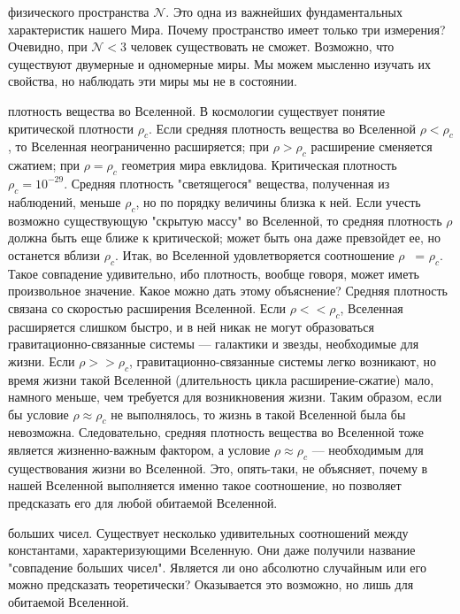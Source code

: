 \begin{itemize}
 физического пространства $\mathcal{N}$. Это одна из важнейших фундаментальных характеристик нашего Мира. Почему пространство имеет только три измерения? Очевидно, при $\mathcal{N}<3$ человек существовать не сможет. Возможно, что существуют двумерные и одномерные миры. Мы можем мысленно изучать их свойства, но наблюдать эти миры мы не в состоянии. 

 плотность вещества во Вселенной. В космологии существует понятие критической плотности $\rho_c$. Если средняя плотность вещества во Вселенной $\rho<\rho_c$, то Вселенная неограниченно расширяется; при $\rho>\rho_c$ расширение сменяется сжатием; при $\rho=\rho_c$ геометрия мира евклидова. Критическая плотность $\rho_c=10^ {-29}$. Средняя плотность "светящегося" вещества, полученная из наблюдений, меньше $\rho_c$, но по порядку величины близка к ней. Если учесть возможно существующую "скрытую массу" во Вселенной, то средняя плотность $\rho$ должна быть еще ближе к критической; может быть она даже превзойдет ее, но останется вблизи $\rho_c$. Итак, во Вселенной удовлетворяется соотношение $\rho$ ~= $\rho_c$. Такое совпадение удивительно, ибо плотность, вообще говоря, может иметь произвольное значение. Какое можно дать этому объяснение? Средняя плотность связана со скоростью расширения Вселенной. Если $\rho << \rho_c$, Вселенная расширяется слишком быстро, и в ней никак не могут образоваться гравитационно-связанные системы --- галактики и звезды, необходимые для жизни. Если $\rho >> \rho_c$, гравитационно-связанные системы легко возникают, но время жизни такой Вселенной (длительность цикла расширение-сжатие) мало, намного меньше, чем требуется для возникновения жизни. Таким образом, если бы условие $\rho \approx \rho_c$ не выполнялось, то жизнь в такой Вселенной была бы невозможна. Следовательно, средняя плотность вещества во Вселенной тоже является жизненно-важным фактором, а условие $\rho \approx \rho_c$ --- необходимым для существования жизни во Вселенной. Это, опять-таки, не объясняет, почему в нашей Вселенной выполняется именно такое соотношение, но позволяет предсказать его для любой обитаемой Вселенной. 

 больших чисел. Существует несколько удивительных соотношений между константами, характеризующими Вселенную. Они даже получили название "совпадение больших чисел". Является ли оно абсолютно случайным или его можно предсказать теоретически? Оказывается это возможно, но лишь для обитаемой Вселенной.


\end{itemize}
